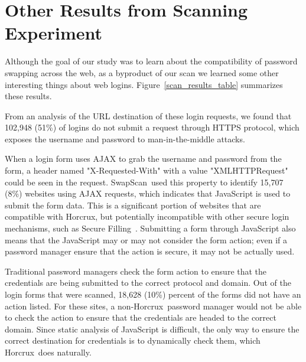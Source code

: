 \documentclass[sigconf]{acmart}
\newcommand*\SecPass{Horcrux}
\newcommand*\SwapScan{SwapScan}
\begin{document}
\section{Other Results from Scanning Experiment}\label{extracting_other_information}

Although the goal of our study was to learn about the compatibility of password swapping across the web, as a byproduct of our scan we learned some other interesting things about web logins. Figure~\ref{scan_results_table} summarizes these results.

From an analysis of the URL destination of these login requests, we found that 102,948 (51\%) of logins do not submit a request through HTTPS protocol, which exposes the username and password to man-in-the-middle attacks. 

When a login form uses AJAX to grab the username and password from the form, a header named "X-Requested-With" with a value "XMLHTTPRequest" could be seen in the request.  \SwapScan\ used this property to identify 15,707
 (8\%) websites using AJAX requests, which indicates that JavaScript is used to submit the form data. This is a significant portion of websites that are compatible with \SecPass, but potentially incompatible with other secure login mechanisms, such as Secure Filling~\cite{Silver2014}. Submitting a form through JavaScript also means that the JavaScript may or may not consider the form action; even if a password manager ensure that the action is secure, it may not be actually used. 

Traditional password managers check the form action to ensure that the credentials are being submitted to the correct protocol and domain. Out of the login forms that were scanned, 18,628 (10\%) percent of the forms did not have an action listed. For these sites, a non-\SecPass\ password manager would not be able to check the action to ensure that the credentials are headed to the correct domain. Since static analysis of JavaScript is difficult, the only way to ensure the correct destination for credentials is to dynamically check them, which \SecPass\ does naturally.
\end{document}
